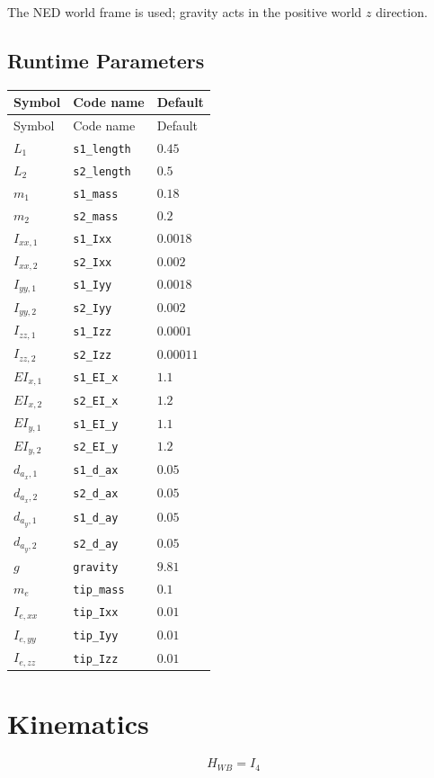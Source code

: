\documentclass[11pt]{article}
\begin{document}
The NED world frame is used; gravity acts in the positive world $z$ direction.
\subsection{Runtime Parameters}
\begin{longtable}{lll}
\hline
Symbol & Code name & Default \\
\hline
\endfirsthead
\hline Symbol & Code name & Default \\
\hline
\endhead
$L_{1}$ & \texttt{s1\_length} & $0.45$ \\
$L_{2}$ & \texttt{s2\_length} & $0.5$ \\
$m_{1}$ & \texttt{s1\_mass} & $0.18$ \\
$m_{2}$ & \texttt{s2\_mass} & $0.2$ \\
$I_{xx,1}$ & \texttt{s1\_Ixx} & $0.0018$ \\
$I_{xx,2}$ & \texttt{s2\_Ixx} & $0.002$ \\
$I_{yy,1}$ & \texttt{s1\_Iyy} & $0.0018$ \\
$I_{yy,2}$ & \texttt{s2\_Iyy} & $0.002$ \\
$I_{zz,1}$ & \texttt{s1\_Izz} & $0.0001$ \\
$I_{zz,2}$ & \texttt{s2\_Izz} & $0.00011$ \\
$EI_{x,1}$ & \texttt{s1\_EI\_x} & $1.1$ \\
$EI_{x,2}$ & \texttt{s2\_EI\_x} & $1.2$ \\
$EI_{y,1}$ & \texttt{s1\_EI\_y} & $1.1$ \\
$EI_{y,2}$ & \texttt{s2\_EI\_y} & $1.2$ \\
$d_{a_x,1}$ & \texttt{s1\_d\_ax} & $0.05$ \\
$d_{a_x,2}$ & \texttt{s2\_d\_ax} & $0.05$ \\
$d_{a_y,1}$ & \texttt{s1\_d\_ay} & $0.05$ \\
$d_{a_y,2}$ & \texttt{s2\_d\_ay} & $0.05$ \\
$g$ & \texttt{gravity} & $9.81$ \\
$m_e$ & \texttt{tip\_mass} & $0.1$ \\
$I_{e,xx}$ & \texttt{tip\_Ixx} & $0.01$ \\
$I_{e,yy}$ & \texttt{tip\_Iyy} & $0.01$ \\
$I_{e,zz}$ & \texttt{tip\_Izz} & $0.01$ \\
\hline
\end{longtable}

\section{Kinematics}
\begin{equation}
H_{WB}=I_4
\end{equation}
\end{document}
